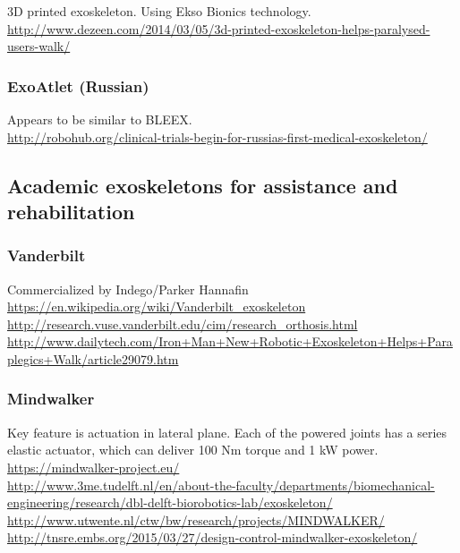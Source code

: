\noindent
3D printed exoskeleton. Using Ekso Bionics technology.\\
\url{http://www.dezeen.com/2014/03/05/3d-printed-exoskeleton-helps-paralysed-users-walk/}\\


\subsubsection{ExoAtlet (Russian)}

\noindent
Appears to be similar to BLEEX.\\
\url{http://robohub.org/clinical-trials-begin-for-russias-first-medical-exoskeleton/}\\


\subsection{Academic exoskeletons for assistance and rehabilitation}

\subsubsection{Vanderbilt}

\noindent
Commercialized by Indego/Parker Hannafin\\
\url{https://en.wikipedia.org/wiki/Vanderbilt_exoskeleton}\\
\url{http://research.vuse.vanderbilt.edu/cim/research_orthosis.html}\\
\url{http://www.dailytech.com/Iron+Man+New+Robotic+Exoskeleton+Helps+Paraplegics+Walk/article29079.htm}\\

\subsubsection{Mindwalker}

\noindent
Key feature is actuation in lateral plane.
Each of the powered joints has a series elastic
actuator, which can deliver 100 Nm torque and 1 kW power.\\
\url{https://mindwalker-project.eu/}\\
\url{http://www.3me.tudelft.nl/en/about-the-faculty/departments/biomechanical-engineering/research/dbl-delft-biorobotics-lab/exoskeleton/}\\
\url{http://www.utwente.nl/ctw/bw/research/projects/MINDWALKER/}\\
\url{http://tnsre.embs.org/2015/03/27/design-control-mindwalker-exoskeleton/}\\

